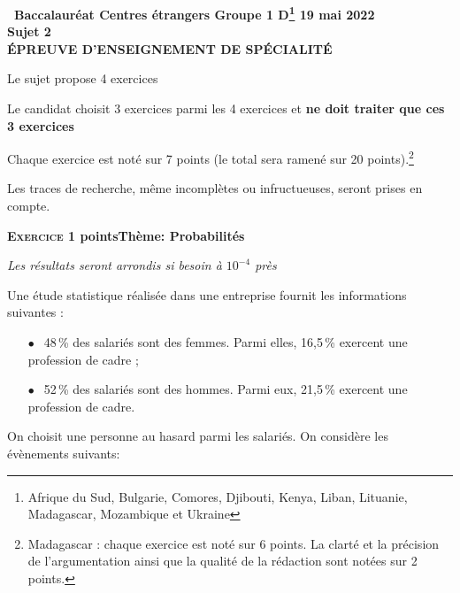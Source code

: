 \documentclass[11pt,a4paper,french]{article}
\begin{document}
\setlength\parindent{0mm}
\pagestyle{fancy}
\thispagestyle{empty}

\begin{center}{\Large\textbf{\decofourleft~Baccalauréat Centres étrangers Groupe 1 D\footnote{Afrique du Sud, Bulgarie, Comores, Djibouti, Kenya, Liban, Lituanie, Madagascar, Mozambique et Ukraine} 19 mai 2022~\decofourright\\[7pt]  Sujet 2\\[7pt] ÉPREUVE D'ENSEIGNEMENT DE SPÉCIALITÉ}}
\end{center}

\vspace{0,25cm}

Le sujet propose 4 exercices

Le candidat choisit 3 exercices parmi les 4 exercices et \textbf{ne doit traiter que ces 3 exercices}

Chaque exercice est noté sur 7 points (le total sera ramené sur 20 points).\footnote{Madagascar : chaque exercice est noté sur 6  points. La clarté et la précision de l'argumentation ainsi que la qualité de la rédaction sont notées sur 2 points.}

Les traces de recherche, même incomplètes ou infructueuses, seront prises en compte.

\bigskip

\textbf{\textsc{Exercice 1}  points\hfill Thème: Probabilités}

\medskip

\emph{Les résultats seront arrondis si besoin à $10^{- 4}$ près}

\medskip

Une étude statistique réalisée dans une entreprise fournit les informations suivantes : 

\setlength\parindent{1cm}
\begin{itemize}
\item[$\bullet~~$] 48\,\% des salariés sont des femmes. Parmi elles, 16,5\,\% exercent une
profession de cadre ;
\item[$\bullet~~$] 52\,\% des salariés sont des hommes. Parmi eux, 21,5\,\% exercent une
profession de cadre.
\end{itemize}
\setlength\parindent{0cm}

\medskip

On choisit une personne au hasard parmi les salariés. On considère les évènements suivants:
\end{document}
